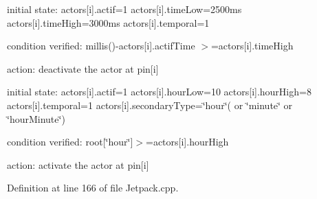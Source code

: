 initial state\+: actors\mbox{[}i\mbox{]}.actif=1 actors\mbox{[}i\mbox{]}.time\+Low=2500ms actors\mbox{[}i\mbox{]}.time\+High=3000ms actors\mbox{[}i\mbox{]}.temporal=1

condition verified\+: millis()-\/actors\mbox{[}i\mbox{]}.actif\+Time $>$=actors\mbox{[}i\mbox{]}.time\+High

action\+: deactivate the actor at pin\mbox{[}i\mbox{]}

initial state\+: actors\mbox{[}i\mbox{]}.actif=1 actors\mbox{[}i\mbox{]}.hour\+Low=10 actors\mbox{[}i\mbox{]}.hour\+High=8 actors\mbox{[}i\mbox{]}.temporal=1 actors\mbox{[}i\mbox{]}.secondary\+Type=\char`\"{}hour\char`\"{}( or \char`\"{}minute\char`\"{} or \char`\"{}hour\+Minute\char`\"{})

condition verified\+: root\mbox{[}\char`\"{}hour\char`\"{}\mbox{]}$>$=actors\mbox{[}i\mbox{]}.hour\+High

action\+: activate the actor at pin\mbox{[}i\mbox{]} 

Definition at line 166 of file Jetpack.\+cpp.


